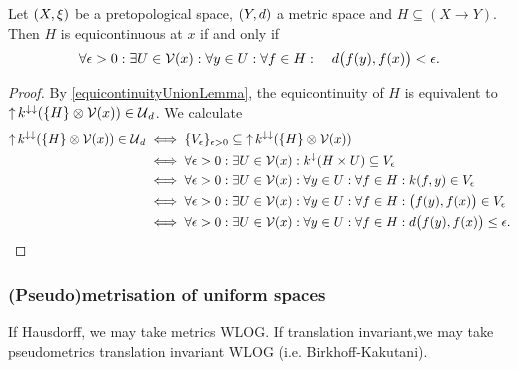 \begin{proposition}
Let $\sSet{X,\xi}$ be a pretopological space, $\sSet{Y,d}$ a metric space and $H\subseteq (X\to Y)$. Then $H$ is equicontinuous at $x$ \textup{if and only if}
\[ \forall \epsilon >0: \exists U \in \operatorname{\mathcal{V}}(x): \forall y\in U: \forall f\in H: \quad d\big(f(y), f(x)\big) < \epsilon. \] 
\end{proposition}
\begin{proof}
By \ref{equicontinuityUnionLemma}, the equicontinuity of $H$ is equivalent to $\operatorname{\uparrow} k^{\downarrow\downarrow}(\{H\}\otimes \operatorname{\mathcal{V}}(x)) \in \operatorname{\mathcal{U}}_d$. We calculate
\begin{align*}
\operatorname{\uparrow} k^{\downarrow\downarrow}(\{H\}\otimes \operatorname{\mathcal{V}}(x)) \in \operatorname{\mathcal{U}}_d &\iff \{V_\epsilon\}_{\epsilon >0} \subseteq \operatorname{\uparrow} k^{\downarrow\downarrow}(\{H\}\otimes \operatorname{\mathcal{V}}(x)) \\
&\iff \forall \epsilon >0: \exists U\in \operatorname{\mathcal{V}}(x): k^{\downarrow}(H\times U) \subseteq V_\epsilon \\
&\iff \forall \epsilon >0: \exists U\in \operatorname{\mathcal{V}}(x): \forall y\in U: \forall f\in H: k(f, y) \in V_\epsilon \\
&\iff \forall \epsilon >0: \exists U\in \operatorname{\mathcal{V}}(x): \forall y\in U: \forall f\in H: \big(f(y), f(x)\big) \in V_\epsilon \\
&\iff \forall \epsilon >0: \exists U\in \operatorname{\mathcal{V}}(x): \forall y\in U: \forall f\in H: d\big(f(y), f(x)\big) \leq \epsilon.
\end{align*}
\end{proof}



\subsubsection{(Pseudo)metrisation of uniform spaces}
If Hausdorff, we may take metrics WLOG. If translation invariant,we may take pseudometrics translation invariant WLOG (i.e. Birkhoff-Kakutani).

